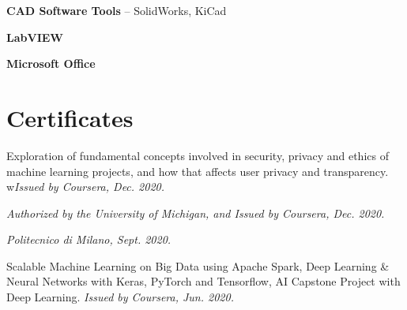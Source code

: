 \documentclass[doublesided,
                paper=a4,
               fontsize=10pt
              ]{my_resume}
\begin{document}
{    \textbf{CAD Software Tools} -- SolidWorks, KiCad
    
    \vspace{8pt}

    \textbf{LabVIEW}

    \vspace{8pt}

    \textbf{Microsoft Office}
    
    \smallskip
    
    \medskip
    \smallskip
    \vspace{-1pt}
    \smallskip
    \vspace{1mm}
    
    \smallskip
    \vspace{-2pt}
    
    \section{Certificates}
    \vspace{2.6pt}
    \medskip

    \vspace{1pt}
    Exploration of fundamental concepts involved in security, privacy and ethics of machine learning projects, and how that affects user privacy and transparency. w\textit{Issued by Coursera, Dec. 2020.}   

    \vspace{14.5pt}
    
    \vspace{1pt}
    \textit{Authorized by the University of Michigan, and Issued by Coursera, Dec. 2020.}
    
    \vspace{14.5pt}
    
    \vspace{1pt}
    \textit{Politecnico di Milano, Sept. 2020.}
    
    \vspace{14.5pt}
    
    \vspace{1pt}
    Scalable Machine Learning on Big Data using Apache Spark, Deep Learning \& Neural Networks with Keras, PyTorch and Tensorflow, AI Capstone Project with Deep Learning. \textit{Issued by Coursera, Jun. 2020.}

}
\end{document}
